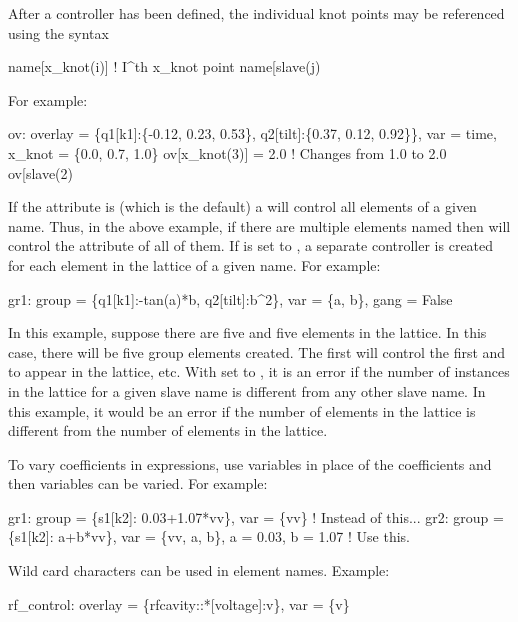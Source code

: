After a controller has been defined, the individual knot points may be referenced using the syntax
\begin{example}
  name[x_knot(i)]           ! I^th x_knot point
  name[slave(j)%
\end{example}
For example:
\begin{example}
  ov: overlay = \{q1[k1]:\{-0.12, 0.23, 0.53\}, q2[tilt]:\{0.37, 0.12, 0.92\}\}, 
                          var = {time}, x_knot = \{0.0, 0.7, 1.0\}
  ov[x_knot(3)] = 2.0           ! Changes from 1.0 to 2.0
  ov[slave(2)%
\end{example}

If the  attribute is  (which is the default) a  will control all
elements of a given name. Thus, in the above example, if there are multiple elements named 
then  will control the  attribute of all of them.  If  is set to ,
a separate controller is created for each element in the lattice of a given name. For example:
\begin{example}
  gr1: group = \{q1[k1]:-tan(a)*b, q2[tilt]:b^2\}, var = \{a, b\}, gang = False
\end{example}
In this example, suppose there are five  and five  elements in the lattice.  In this
case, there will be five  group elements created. The first  will control the first
 and  to appear in the lattice, etc. With  set to , it is an error
if the number of instances in the lattice for a given slave name is different from any other slave
name. In this example, it would be an error if the number of  elements in the lattice is
different from the number of  elements in the lattice.

To vary coefficients in expressions, use variables in place of the coefficients and then variables
can be varied. For example:
\begin{example}
  gr1: group = \{s1[k2]: 0.03+1.07*vv\}, var = \{vv\}                     ! Instead of this...
  gr2: group = \{s1[k2]: a+b*vv\}, var = \{vv, a, b\}, a = 0.03, b = 1.07 !   Use this.
\end{example}

Wild card characters can be used in element names. Example:
\begin{example}
  rf_control: overlay = \{rfcavity::*[voltage]:v\}, var = \{v\}
\end{example}

